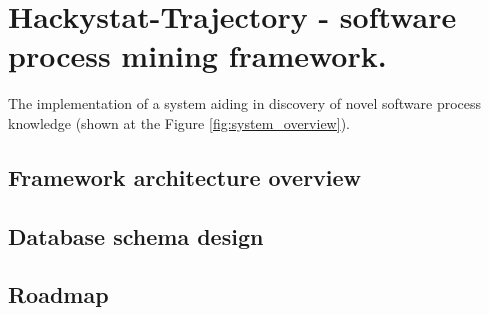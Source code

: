 \chapter{Hackystat-Trajectory - software process mining framework.} \label{trajectory}
The implementation of a system aiding in discovery of novel software process knowledge (shown at the Figure \ref{fig:system_overview}).

\section{Framework architecture overview}

\section{Database schema design}

\section{Roadmap}
